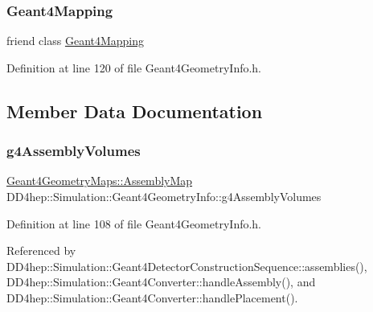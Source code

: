 \subsubsection{\texorpdfstring{Geant4\+Mapping}{Geant4Mapping}}
{\footnotesize\ttfamily friend class \hyperlink{class_d_d4hep_1_1_simulation_1_1_geant4_mapping}{Geant4\+Mapping}\hspace{0.3cm}{\ttfamily [friend]}}



Definition at line 120 of file Geant4\+Geometry\+Info.\+h.



\subsection{Member Data Documentation}
\hypertarget{class_d_d4hep_1_1_simulation_1_1_geant4_geometry_info_a663f4e581a601fe42c81bd936c4d6960}{}\label{class_d_d4hep_1_1_simulation_1_1_geant4_geometry_info_a663f4e581a601fe42c81bd936c4d6960} 
\subsubsection{\texorpdfstring{g4\+Assembly\+Volumes}{g4AssemblyVolumes}}
{\footnotesize\ttfamily \hyperlink{namespace_d_d4hep_1_1_simulation_1_1_geant4_geometry_maps_ae1f67e315dd299b17e4ea1c58a47b312}{Geant4\+Geometry\+Maps\+::\+Assembly\+Map} D\+D4hep\+::\+Simulation\+::\+Geant4\+Geometry\+Info\+::g4\+Assembly\+Volumes}



Definition at line 108 of file Geant4\+Geometry\+Info.\+h.



Referenced by D\+D4hep\+::\+Simulation\+::\+Geant4\+Detector\+Construction\+Sequence\+::assemblies(), D\+D4hep\+::\+Simulation\+::\+Geant4\+Converter\+::handle\+Assembly(), and D\+D4hep\+::\+Simulation\+::\+Geant4\+Converter\+::handle\+Placement().

\hypertarget{class_d_d4hep_1_1_simulation_1_1_geant4_geometry_info_a40b8d4041f5b89826971ffb9d1db9e1c}{}\label{class_d_d4hep_1_1_simulation_1_1_geant4_geometry_info_a40b8d4041f5b89826971ffb9d1db9e1c} 
